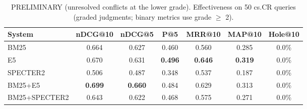 \begin{table}[t]
\centering
\small
\caption{PRELIMINARY (unresolved conflicts at the lower grade). Effectiveness on 50 cs.CR queries (graded judgments; binary metrics use grade $\geq$ 2).}
\label{tab:main}
\begin{tabular}{lcccccc}
\toprule
System & nDCG@10 & nDCG@5 & P@5 & MRR@10 & MAP@10 & Hole@10 \\
\midrule
BM25 & 0.664 & 0.627 & 0.460 & 0.560 & 0.285 & 0.0\% \\
E5 & 0.670 & 0.631 & \textbf{0.496} & \textbf{0.646} & \textbf{0.319} & 0.0\% \\
SPECTER2 & 0.506 & 0.487 & 0.348 & 0.537 & 0.187 & 0.0\% \\
BM25+E5 & \textbf{0.699} & \textbf{0.660} & 0.484 & 0.629 & 0.313 & 0.0\% \\
BM25+SPECTER2 & 0.643 & 0.622 & 0.468 & 0.575 & 0.271 & 0.0\% \\
\bottomrule
\end{tabular}
\end{table}
